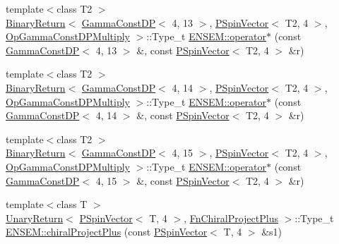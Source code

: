 \begin{DoxyCompactItemize}
\item 
{\footnotesize template$<$class T2 $>$ }\\\mbox{\hyperlink{structENSEM_1_1BinaryReturn}{Binary\+Return}}$<$ \mbox{\hyperlink{classENSEM_1_1GammaConstDP}{Gamma\+Const\+DP}}$<$ 4, 13 $>$, \mbox{\hyperlink{classENSEM_1_1PSpinVector}{P\+Spin\+Vector}}$<$ T2, 4 $>$, \mbox{\hyperlink{structENSEM_1_1OpGammaConstDPMultiply}{Op\+Gamma\+Const\+D\+P\+Multiply}} $>$\+::Type\+\_\+t \mbox{\hyperlink{group__primspinvector_gaa05448d24f9c6526e5785b8c81a604bd}{E\+N\+S\+E\+M\+::operator$\ast$}} (const \mbox{\hyperlink{classENSEM_1_1GammaConstDP}{Gamma\+Const\+DP}}$<$ 4, 13 $>$ \&, const \mbox{\hyperlink{classENSEM_1_1PSpinVector}{P\+Spin\+Vector}}$<$ T2, 4 $>$ \&r)
\item 
{\footnotesize template$<$class T2 $>$ }\\\mbox{\hyperlink{structENSEM_1_1BinaryReturn}{Binary\+Return}}$<$ \mbox{\hyperlink{classENSEM_1_1GammaConstDP}{Gamma\+Const\+DP}}$<$ 4, 14 $>$, \mbox{\hyperlink{classENSEM_1_1PSpinVector}{P\+Spin\+Vector}}$<$ T2, 4 $>$, \mbox{\hyperlink{structENSEM_1_1OpGammaConstDPMultiply}{Op\+Gamma\+Const\+D\+P\+Multiply}} $>$\+::Type\+\_\+t \mbox{\hyperlink{group__primspinvector_gad8abbefefdc24a79b3e5e3a161441643}{E\+N\+S\+E\+M\+::operator$\ast$}} (const \mbox{\hyperlink{classENSEM_1_1GammaConstDP}{Gamma\+Const\+DP}}$<$ 4, 14 $>$ \&, const \mbox{\hyperlink{classENSEM_1_1PSpinVector}{P\+Spin\+Vector}}$<$ T2, 4 $>$ \&r)
\item 
{\footnotesize template$<$class T2 $>$ }\\\mbox{\hyperlink{structENSEM_1_1BinaryReturn}{Binary\+Return}}$<$ \mbox{\hyperlink{classENSEM_1_1GammaConstDP}{Gamma\+Const\+DP}}$<$ 4, 15 $>$, \mbox{\hyperlink{classENSEM_1_1PSpinVector}{P\+Spin\+Vector}}$<$ T2, 4 $>$, \mbox{\hyperlink{structENSEM_1_1OpGammaConstDPMultiply}{Op\+Gamma\+Const\+D\+P\+Multiply}} $>$\+::Type\+\_\+t \mbox{\hyperlink{group__primspinvector_ga23212ad644650a519a334e7eb30cb99a}{E\+N\+S\+E\+M\+::operator$\ast$}} (const \mbox{\hyperlink{classENSEM_1_1GammaConstDP}{Gamma\+Const\+DP}}$<$ 4, 15 $>$ \&, const \mbox{\hyperlink{classENSEM_1_1PSpinVector}{P\+Spin\+Vector}}$<$ T2, 4 $>$ \&r)
\item 
{\footnotesize template$<$class T $>$ }\\\mbox{\hyperlink{structENSEM_1_1UnaryReturn}{Unary\+Return}}$<$ \mbox{\hyperlink{classENSEM_1_1PSpinVector}{P\+Spin\+Vector}}$<$ T, 4 $>$, \mbox{\hyperlink{structENSEM_1_1FnChiralProjectPlus}{Fn\+Chiral\+Project\+Plus}} $>$\+::Type\+\_\+t \mbox{\hyperlink{group__primspinvector_ga2d58ba66261a878c90b4c5dbc1af1863}{E\+N\+S\+E\+M\+::chiral\+Project\+Plus}} (const \mbox{\hyperlink{classENSEM_1_1PSpinVector}{P\+Spin\+Vector}}$<$ T, 4 $>$ \&s1)

\end{DoxyCompactItemize}
